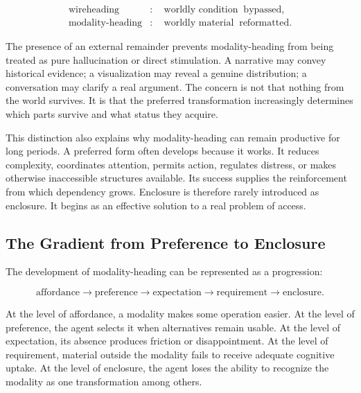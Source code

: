 \documentclass[11pt]{article}
\begin{document}
\begin{align}
  \text{wireheading} &: \quad
  \text{worldly condition} \;\;\text{bypassed},
  \label{eq:wireheading}\\
  \text{modality-heading} &: \quad
  \text{worldly material} \;\;\text{reformatted}.
  \label{eq:modality-heading}
\end{align}

The presence of an external remainder prevents modality-heading from being
treated as pure hallucination or direct stimulation. A narrative may convey
historical evidence; a visualization may reveal a genuine distribution; a
conversation may clarify a real argument. The concern is not that nothing
from the world survives. It is that the preferred transformation increasingly
determines which parts survive and what status they acquire.

This distinction also explains why modality-heading can remain productive for
long periods. A preferred form often develops because it works. It reduces
complexity, coordinates attention, permits action, regulates distress, or
makes otherwise inaccessible structures available. Its success supplies the
reinforcement from which dependency grows. Enclosure is therefore rarely
introduced as enclosure. It begins as an effective solution to a real problem
of access.

\subsection{The Gradient from Preference to Enclosure}

The development of modality-heading can be represented as a progression:

\begin{equation}
  \text{affordance}
  \longrightarrow
  \text{preference}
  \longrightarrow
  \text{expectation}
  \longrightarrow
  \text{requirement}
  \longrightarrow
  \text{enclosure}.
  \label{eq:heading-gradient}
\end{equation}

At the level of affordance, a modality makes some operation easier. At the
level of preference, the agent selects it when alternatives remain usable.
At the level of expectation, its absence produces friction or
disappointment. At the level of requirement, material outside the modality
fails to receive adequate cognitive uptake. At the level of enclosure, the
agent loses the ability to recognize the modality as one transformation among
others.
\end{document}
